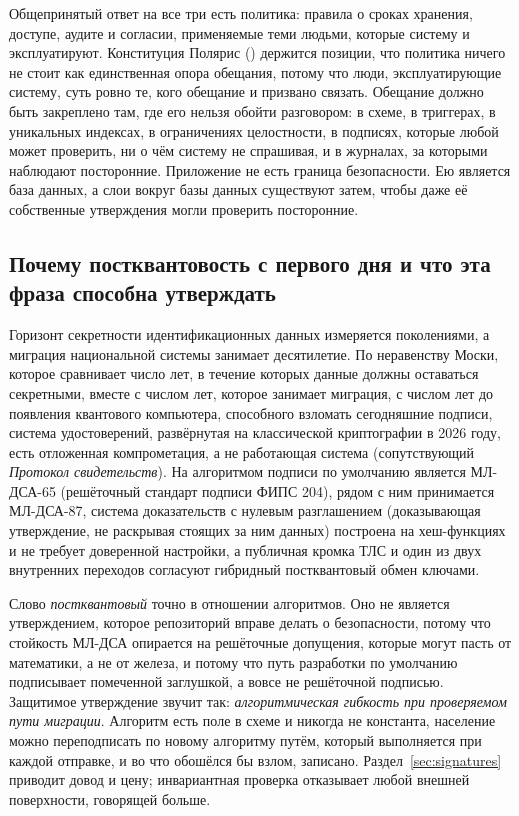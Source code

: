 Общепринятый ответ на все три есть политика: правила о сроках хранения, доступе, аудите и
согласии, применяемые теми людьми, которые систему и эксплуатируют. Конституция Полярис
() держится позиции, что политика ничего не стоит как единственная опора
обещания, потому что люди, эксплуатирующие систему, суть ровно те, кого обещание и призвано
связать. Обещание должно быть закреплено там, где его нельзя обойти разговором: в схеме, в
триггерах, в уникальных индексах, в ограничениях целостности, в подписях, которые любой может
проверить, ни о чём систему не спрашивая, и в журналах, за которыми наблюдают посторонние.
Приложение не есть граница безопасности. Ею является база данных, а слои вокруг базы данных
существуют затем, чтобы даже её собственные утверждения могли проверить посторонние.

\subsection{Почему постквантовость с первого дня и что эта фраза способна утверждать}

Горизонт секретности идентификационных данных измеряется поколениями, а миграция национальной
системы занимает десятилетие. По неравенству Моски, которое сравнивает число лет, в течение которых
данные должны оставаться секретными, вместе с числом лет, которое занимает миграция, с числом лет до
появления квантового компьютера, способного взломать сегодняшние подписи, система удостоверений,
развёрнутая на классической криптографии в 2026 году, есть отложенная компрометация, а не
работающая система (сопутствующий \emph{Протокол свидетельств}). На  алгоритмом подписи по умолчанию является
МЛ-ДСА-65 (решёточный стандарт подписи ФИПС 204), рядом с ним принимается МЛ-ДСА-87, система
доказательств с нулевым разглашением (доказывающая утверждение, не раскрывая стоящих за ним данных)
построена на хеш-функциях и не требует доверенной настройки, а публичная кромка ТЛС
и один из двух внутренних переходов согласуют гибридный постквантовый обмен ключами.

Слово \emph{постквантовый} точно в отношении алгоритмов. Оно не
является утверждением, которое репозиторий вправе делать о безопасности, потому что стойкость
МЛ-ДСА опирается на решёточные допущения, которые могут пасть от математики, а не от железа, и
потому что путь разработки по умолчанию подписывает помеченной заглушкой, а вовсе не решёточной
подписью. Защитимое утверждение звучит так: \emph{алгоритмическая гибкость при проверяемом пути
миграции}. Алгоритм есть поле в схеме и никогда не константа, население можно переподписать по
новому алгоритму путём, который выполняется при каждой отправке, и во что обошёлся бы взлом,
записано. Раздел~\ref{sec:signatures} приводит довод и цену; инвариантная проверка отказывает
любой внешней поверхности, говорящей больше.

